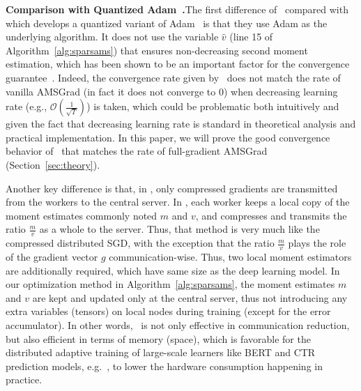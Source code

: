 \documentclass[11pt]{article}
\begin{document}
\textbf{Comparison with Quantized Adam~\cite{chen2020quantized}.}\hspace{0.1in}The first difference of \algo\ compared with \citep{chen2020quantized} which develops a quantized variant of Adam~\cite{kingma2014adam} is that they use Adam as the underlying algorithm. It does not use the variable $\hat v$ (line 15 of Algorithm~\ref{alg:sparsams}) that ensures non-decreasing second moment estimation, which has been shown to be an important factor for the convergence guarantee~\cite{reddi2019convergence,Proc:Chen_ICLR19}. Indeed, the convergence rate given by~\cite{chen2020quantized} does not match the rate of vanilla AMSGrad (in fact it does not converge to 0) when decreasing learning rate (e.g., $\mathcal O(\frac{1}{\sqrt T})$) is taken, which could be problematic both intuitively and given the fact that decreasing learning rate is standard in theoretical analysis and practical implementation. In this paper, we will prove the good convergence behavior of \algo\ that matches the rate of full-gradient AMSGrad (Section~\ref{sec:theory}).


Another key difference is that, in \algo, only compressed gradients are transmitted from the workers to the central server. 
In \citep{chen2020quantized}, each worker keeps a local copy of the moment estimates commonly noted $m$ and $v$, and compresses and transmits the ratio $\frac{m}{v}$ as a whole to the server. 
Thus, that method is very much like the compressed distributed SGD, with the exception that the ratio $\frac{m}{v}$ plays the role of the gradient vector $g$ communication-wise. Thus, two local moment estimators are additionally required, which have same size as the deep learning model.
In our optimization method in Algorithm~\ref{alg:sparsams}, the moment estimates $m$ and $v$ are kept and updated only at the central server, thus not introducing any extra variables (tensors) on local nodes during training (except for the error accumulator). In other words, \algo\ is not only effective in communication reduction, but also efficient in terms of memory (space), which is favorable for the distributed adaptive training of large-scale learners like BERT and CTR prediction models, e.g.~\cite{Proc:BERT,Proc:Zhao_MLsys20}, to lower the hardware consumption happening in practice.
\end{document}

